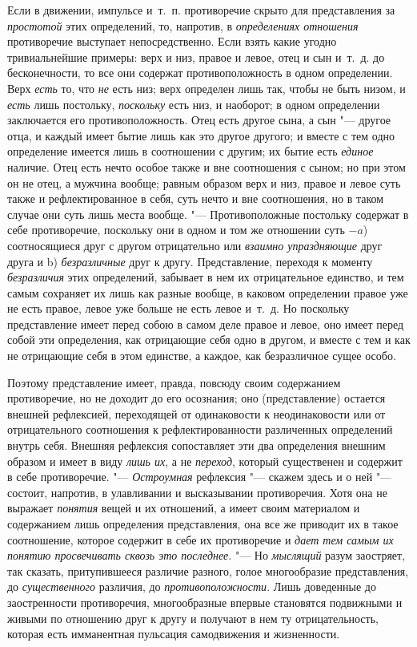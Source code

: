 Если в движении, импульсе и~т.~п. противоречие скрыто для представления за
{\em простотой} этих определений, то, напротив, в
{\em определениях отношения} противоречие выступает
непосредственно. Если взять какие угодно тривиальнейшие примеры: верх и
низ, правое и левое, отец и сын и~т.~д. до бесконечности, то все они
содержат противоположность в одном определении. Верх
{\em есть} то, что {\em не} есть
низ; верх определен лишь так, чтобы не быть низом, и
{\em есть} лишь постольку, {\em поскольку} есть низ, и наоборот; в одном
определении заключается его противоположность. Отец есть другое сына, а сын
"--- другое отца, и каждый имеет бытие лишь как это другое другого; и вместе с
тем одно определение имеется лишь в соотношении с другим; их бытие есть
{\em единое} наличие. Отец есть нечто особое также и
вне соотношения с сыном; но при этом он не отец, а мужчина вообще; равным
образом верх и низ, правое и левое суть также и рефлектированное в себя,
суть нечто и вне соотношения, но в таком случае они суть лишь места вообще.
"--- Противоположные постольку содержат в себе противоречие, поскольку они в
одном и том же отношении суть $-a$) соотносящиеся
друг с другом отрицательно или {\em взаимно
упраздняющие} друг друга и b) {\em безразличные} друг к
другу. Представление, переходя к моменту
{\em безразличия} этих определений, забывает в нем их
отрицательное единство, и тем самым сохраняет их лишь как разные вообще, в
каковом определении правое уже не есть правое, левое уже больше не есть
левое и~т.~д. Но поскольку представление имеет перед собою в самом деле
правое и левое, оно имеет перед собой эти определения, как отрицающие себя
одно в другом, и вместе с тем и как не отрицающие себя в этом единстве, а
каждое, как безразличное сущее особо.

Поэтому представление имеет, правда, повсюду своим содержанием противоречие,
но не доходит до его осознания; оно (представление) остается внешней
рефлексией, переходящей от одинаковости к неодинаковости или от
отрицательного соотношения к рефлектированности различенных определений
внутрь себя. Внешняя рефлексия сопоставляет эти два определения внешним
образом и имеет в виду {\em лишь их}, а не
{\em переход}, который существенен и содержит в себе
противоречие. "--- {\em Остроумная} рефлексия "--- скажем
здесь и о ней "--- состоит, напротив, в улавливании и высказывании
противоречия. Хотя она не выражает {\em понятия} вещей
и их отношений, а имеет своим материалом и содержанием лишь определения
представления, она все же приводит их в такое соотношение, которое содержит
в себе их противоречие и {\em дает тем самым их понятию
просвечивать сквозь это последнее}. "--- Но {\em мыслящий}
разум заостряет, так сказать, притупившееся различие разного, голое
многообразие представления, до {\em существенного}
различия, до {\em противоположности}. Лишь доведенные
до заостренности противоречия, многообразные впервые становятся подвижными
и живыми по отношению друг к другу и получают в нем ту отрицательность,
которая есть имманентная пульсация самодвижения и жизненности.

